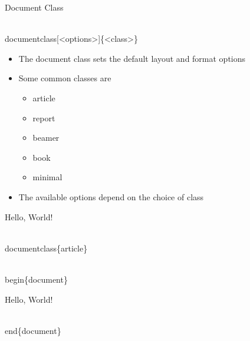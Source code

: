 \documentclass{beamer}
\begin{document}
\begin{frame}{Document Class}
	\begin{semiverbatim}
		\\documentclass[<options>]\{<class>\}
	\end{semiverbatim}
	\begin{itemize}
		\item<1-> The document class sets the default layout and format options 
		\item<2-> Some common classes are
			\begin{itemize}
				\item article
				\item report
				\item beamer
				\item book
				\item minimal
			\end{itemize}
		\item<3-> The available options depend on the choice of class
	\end{itemize}
\end{frame}

\begin{frame}[fragile]{Hello, World!}
	\begin{semiverbatim}
		\\documentclass\{article\}
		
		\\begin\{document\}
		
 			Hello, World!
		
		\\end\{document\}
	\end{semiverbatim}
\end{frame}
\end{document}
